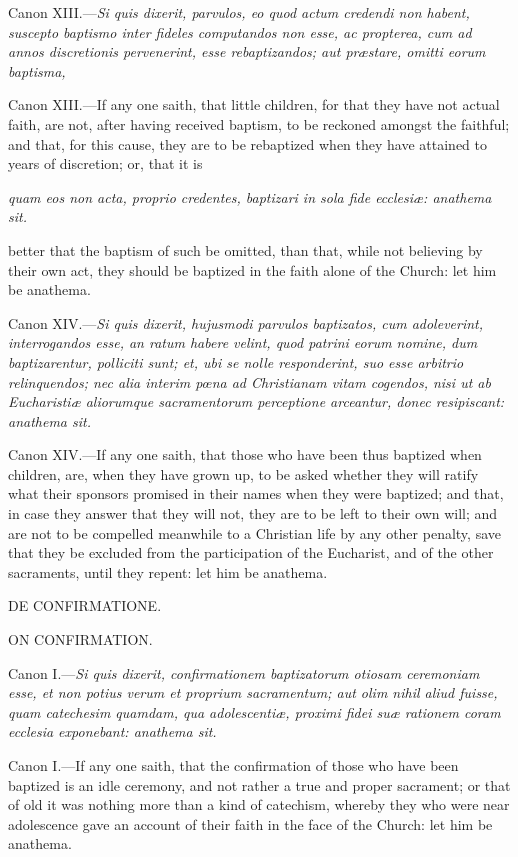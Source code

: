 Canon XIII.—\emph{Si quis dixerit, parvulos, eo quod actum credendi non habent, suscepto baptismo inter fideles computandos non esse, ac propterea, cum ad annos discretionis pervenerint, esse rebaptizandos; aut præstare, omitti eorum baptisma,}

Canon XIII.—If any one saith, that little children, for that they have not actual faith, are not, after having received baptism, to be reckoned amongst the faithful; and that, for this cause, they are to be rebaptized when they have attained to years of discretion; or, that it is

\emph{quam eos non acta, proprio credentes, baptizari in sola fide ecclesiæ: anathema sit.}

better that the baptism of such be omitted, than that, while not believing by their own act, they should be baptized in the faith alone of the Church: let him be anathema.

Canon XIV.—\emph{Si quis dixerit, hujusmodi parvulos baptizatos, cum adoleverint, interrogandos esse, an ratum habere velint, quod patrini eorum nomine, dum baptizarentur, polliciti sunt; et, ubi se nolle responderint, suo esse arbitrio relinquendos; nec alia interim pœna ad Christianam vitam cogendos, nisi ut ab Eucharistiæ aliorumque sacramentorum perceptione arceantur, donec resipiscant: anathema sit.}

Canon XIV.—If any one saith, that those who have been thus baptized when children, are, when they have grown up, to be asked whether they will ratify what their sponsors promised in their names when they were baptized; and that, in case they answer that they will not, they are to be left to their own will; and are not to be compelled meanwhile to a Christian life by any other penalty, save that they be excluded from the participation of the Eucharist, and of the other sacraments, until they repent: let him be anathema.

DE CONFIRMATIONE.

ON CONFIRMATION.

Canon I.—\emph{Si quis dixerit, confirmationem baptizatorum otiosam ceremoniam esse, et non potius verum et proprium sacramentum; aut olim nihil aliud fuisse, quam catechesim quamdam, qua adolescentiæ, proximi fidei suæ rationem coram ecclesia exponebant: anathema sit.}

Canon I.—If any one saith, that the confirmation of those who have been baptized is an idle ceremony, and not rather a true and proper sacrament; or that of old it was nothing more than a kind of catechism, whereby they who were near adolescence gave an account of their faith in the face of the Church: let him be anathema.

